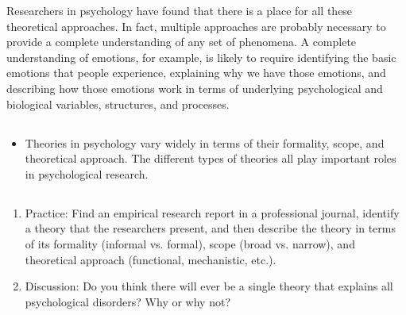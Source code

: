 Researchers in psychology have found that there is a place for all these theoretical approaches. In fact, multiple approaches are probably necessary to provide a complete understanding of any set of phenomena. A complete understanding of emotions, for example, is likely to require identifying the basic emotions that people experience, explaining why we have those emotions, and describing how those emotions work in terms of underlying psychological and biological variables, structures, and processes.


\subsection{}

\begin{fullwidth}

\begin{itemize}

\item  Theories in psychology vary widely in terms of their formality, scope, and theoretical approach. The different types of theories all play important roles in psychological research.

\end{itemize}

\end{fullwidth}


\subsection{}

\begin{fullwidth}

\begin{enumerate}

\item Practice: Find an empirical research report in a professional journal, identify a theory that the researchers present, and then describe the theory in terms of its formality (informal vs. formal), scope (broad vs. narrow), and theoretical approach (functional, mechanistic, etc.).

\item Discussion: Do you think there will ever be a single theory that explains all psychological disorders? Why or why not?

\end{enumerate}

\end{fullwidth}  

